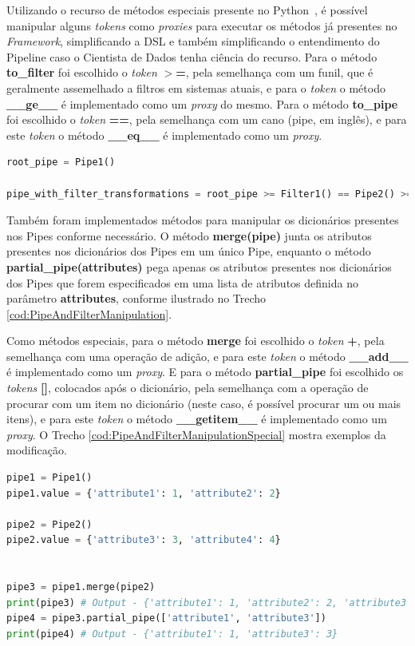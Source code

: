 \documentclass[portugues]{ic-tese}
\begin{document}
Utilizando o recurso de métodos especiais presente no Python~\citep{Pyspmethods_2022}, é possível manipular alguns \textit{tokens} como \textit{proxies} para executar os métodos já presentes no \textit{Framework}, simplificando a DSL e também simplificando o entendimento do Pipeline caso o Cientista de Dados tenha ciência do recurso. Para o método \textbf{to\_filter} foi escolhido o \textit{token} \textbf{$>$=}, pela semelhança com um funil, que é geralmente assemelhado a filtros em sistemas atuais, e para o \textit{token} o método \textbf{\_\_ge\_\_} é implementado como um \textit{proxy} do mesmo. Para o método \textbf{to\_pipe} foi escolhido o \textit{token} \textbf{==}, pela semelhança com um cano (pipe, em inglês), e para este \textit{token} o método \textbf{\_\_eq\_\_} é implementado como um \textit{proxy}.

\begin{lstlisting}[language=Python, caption=Trecho \ref{cod:PipeAndFilterMethods} adaptado com métodos especiais da linguagem \textit{Python},label=cod:PipeAndFilterSpecialMethods]
root_pipe = Pipe1()

pipe_with_filter_transformations = root_pipe >= Filter1() == Pipe2() >= Filter2() == Pipe3()
\end{lstlisting}

Também foram implementados métodos para manipular os dicionários presentes nos Pipes conforme necessário. O método \textbf{merge(pipe)} junta os atributos presentes nos dicionários dos Pipes em um único Pipe, enquanto o método \textbf{partial\_pipe(attributes)} pega apenas os atributos presentes nos dicionários dos Pipes que forem especificados em uma lista de atributos definida no parâmetro \textbf{attributes}, conforme ilustrado no Trecho \ref{cod:PipeAndFilterManipulation}.

Como métodos especiais, para o método \textbf{merge} foi escolhido o \textit{token} \textbf{+}, pela semelhança com uma operação de adição, e para este \textit{token} o método \textbf{\_\_add\_\_} é implementado como um \textit{proxy}. E para o método \textbf{partial\_pipe} foi escolhido os \textit{tokens} \textbf{[]}, colocados após o dicionário, pela semelhança com a operação de procurar com um item no dicionário (neste caso, é possível procurar um ou mais itens), e para este \textit{token} o método \textbf{\_\_getitem\_\_} é implementado como um \textit{proxy}. O Trecho \ref{cod:PipeAndFilterManipulationSpecial} mostra exemplos da modificação.

\begin{lstlisting}[language=Python, caption=Manipulações para Pipes presentes no \textit{Framework},label=cod:PipeAndFilterManipulation]
pipe1 = Pipe1()
pipe1.value = {'attribute1': 1, 'attribute2': 2}

pipe2 = Pipe2()
pipe2.value = {'attribute3': 3, 'attribute4': 4}


pipe3 = pipe1.merge(pipe2)
print(pipe3) # Output - {'attribute1': 1, 'attribute2': 2, 'attribute3': 3, 'attribute4': 4}
pipe4 = pipe3.partial_pipe(['attribute1', 'attribute3'])
print(pipe4) # Output - {'attribute1': 1, 'attribute3': 3}
\end{lstlisting}
\end{document}
